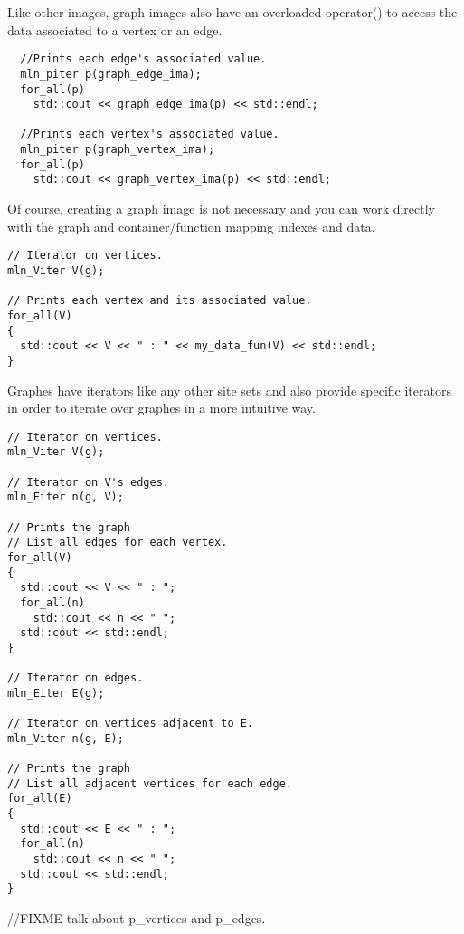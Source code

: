 \documentclass{report}
\begin{document}
Like other images, graph images also have an overloaded operator() to access the
data associated to a vertex or an edge.
\begin{lstlisting}
  //Prints each edge's associated value.
  mln_piter p(graph_edge_ima);
  for_all(p)
    std::cout << graph_edge_ima(p) << std::endl;

  //Prints each vertex's associated value.
  mln_piter p(graph_vertex_ima);
  for_all(p)
    std::cout << graph_vertex_ima(p) << std::endl;
\end{lstlisting}

Of course, creating a graph image is not necessary and you can work directly
with the graph and container/function mapping indexes and data.

\begin{lstlisting}
// Iterator on vertices.
mln_Viter V(g);

// Prints each vertex and its associated value.
for_all(V)
{
  std::cout << V << " : " << my_data_fun(V) << std::endl;
}
\end{lstlisting}

Graphes have iterators like any other site sets and also provide
specific iterators in order to iterate over graphes in a more intuitive way.

\begin{lstlisting}
// Iterator on vertices.
mln_Viter V(g);

// Iterator on V's edges.
mln_Eiter n(g, V);

// Prints the graph
// List all edges for each vertex.
for_all(V)
{
  std::cout << V << " : ";
  for_all(n)
    std::cout << n << " ";
  std::cout << std::endl;
}

// Iterator on edges.
mln_Eiter E(g);

// Iterator on vertices adjacent to E.
mln_Viter n(g, E);

// Prints the graph
// List all adjacent vertices for each edge.
for_all(E)
{
  std::cout << E << " : ";
  for_all(n)
    std::cout << n << " ";
  std::cout << std::endl;
}
\end{lstlisting}

//FIXME talk about p\_vertices and p\_edges.
\end{document}
